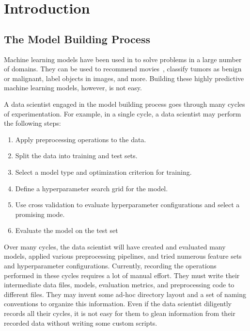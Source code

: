 \chapter{Introduction}
\section{The Model Building Process}
Machine learning models have been used in to solve problems in a large number of
domains. They can be used to recommend movies~\cite{Breiman}, 
classify tumors as benign or malignant, label objects in images, and more. 
Building these highly predictive machine learning models, however, is not easy. 

A data scientist engaged in the model building process goes through many cycles of
experimentation. For example, in a single cycle, a data scientist may perform the
following steps:

\begin{enumerate}
  \item Apply preprocessing operations to the data.
  \item Split the data into training and test sets.
  \item Select a model type and optimization criterion for training.
  \item Define a hyperparameter search grid for the model.
  \item Use cross validation to evaluate hyperparameter configurations and select a 
    promising mode.
  \item Evaluate the model on the test set
\end{enumerate}

Over many cycles, the data scientist will have created and evaluated many models,
applied various preprocessing pipelines, and tried numerous feature sets and hyperparameter
configurations. Currently, recording the operations performed in these cycles requires
a lot of manual effort. They must write their intermediate data files, models, evaluation metrics,
and preprocessing code to different files. They may invent some ad-hoc directory layout 
and a set of naming conventions to organize this information. Even if the data scientist
diligently records all their cycles, it is not easy for them to glean information from their
recorded data without writing some custom scripts.

